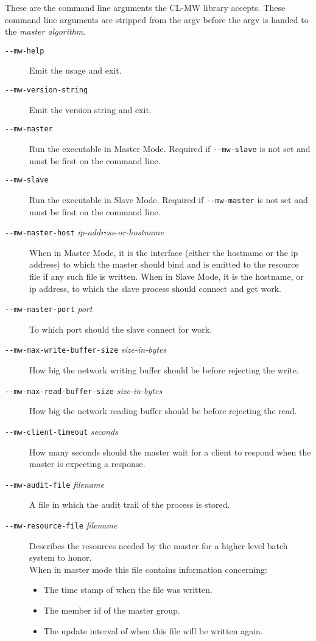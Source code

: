 \documentclass[titlepage,12pt]{book}
\newcommand{\xsmall}{\latexhtml{\small}{}}
\newcommand{\xnormalsize}{\latexhtml{\normalsize}{}}
\newcommand{\clmw}{\xsmall\textsc{CL-MW}\xnormalsize\xspace}
\newcommand{\ma}{\textit{master algorithm}\xspace}
\newcommand{\dash}{\texttt{-}}
\newcommand{\Option}[1]{\dash\dash\texttt{#1}}
\newcommand{\OptionV}[2]{\dash\dash\texttt{#1} \textit{#2}}
\begin{document}
These are the command line arguments the \clmw library accepts. These
command line arguments are stripped from the argv before the argv is
handed to the \ma.

\begin{description}
\item[\Option{mw-help}]
    Emit the usage and exit.
\item[\Option{mw-version-string}]
    Emit the version string and exit.
\item[\Option{mw-master}]
    Run the executable in Master Mode. Required if \Option{mw-slave} is not set
	and must be first on the command line.
\item[\Option{mw-slave}]
    Run the executable in Slave Mode. Required if \Option{mw-master} is not set
	and must be first on the command line.
\item[\OptionV{mw-master-host}{ip-address-or-hostname}]
    When in Master Mode, it is the interface (either the hostname or
    the ip address) to which the master should bind and is emitted to
    the resource file if any such file is written.
    When in Slave Mode, it is the hostname, or ip address, to which
    the slave process should connect and get work.
\item[\OptionV{mw-master-port}{port}]
    To which port should the slave connect for work.
\item[\OptionV{mw-max-write-buffer-size}{size-in-bytes}]
    How big the network writing buffer should be before rejecting the write.
\item[\OptionV{mw-max-read-buffer-size}{size-in-bytes}]
    How big the network reading buffer should be before rejecting the read.
\item[\OptionV{mw-client-timeout}{seconds}]
    How many seconds should the master wait for a client to respond
    when the master is expecting a response.
\item[\OptionV{mw-audit-file}{filename}]
    A file in which the audit trail of the process is stored.
\item[\OptionV{mw-resource-file}{filename}]
    Describes the resources needed by the master for a higher level batch
    system to honor.\\
	When in master mode this file contains information concerning:
	\begin{itemize}
		\item The time stamp of when the file was written.
		\item The member id of the master group.
		\item The update interval of when this file will be written again.

\end{itemize}
\end{description}
\end{document}
